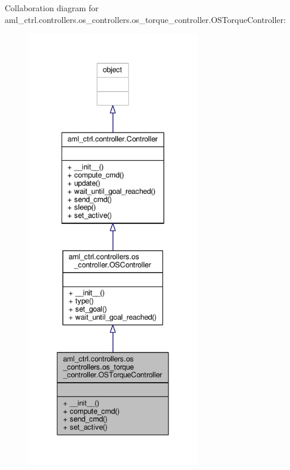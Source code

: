 Collaboration diagram for aml\-\_\-ctrl.\-controllers.\-os\-\_\-controllers.\-os\-\_\-torque\-\_\-controller.\-O\-S\-Torque\-Controller\-:\nopagebreak
\begin{figure}[H]
\begin{center}
\leavevmode
\includegraphics[height=550pt]{classaml__ctrl_1_1controllers_1_1os__controllers_1_1os__torque__controller_1_1_o_s_torque_controller__coll__graph}
\end{center}
\end{figure}

